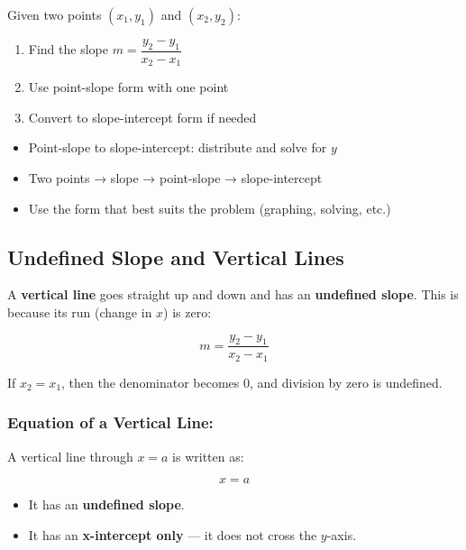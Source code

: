\documentclass[11pt]{article}
\begin{document}
Given two points \( (x_1, y_1) \) and \( (x_2, y_2) \):
\begin{enumerate}
  \item Find the slope \( m = \dfrac{y_2 - y_1}{x_2 - x_1} \)
  \item Use point-slope form with one point
  \item Convert to slope-intercept form if needed
\end{enumerate}

\begin{tcolorbox}[colback=purple!5!white, colframe=purple!80!black, title=Summary: Converting Forms]
\begin{itemize}
  \item Point-slope to slope-intercept: distribute and solve for \( y \)
  \item Two points → slope → point-slope → slope-intercept
  \item Use the form that best suits the problem (graphing, solving, etc.)
\end{itemize}
\end{tcolorbox}
\subsection{Undefined Slope and Vertical Lines}

A \textbf{vertical line} goes straight up and down and has an \textbf{undefined slope}. This is because its run (change in \( x \)) is zero:

\[
m = \frac{y_2 - y_1}{x_2 - x_1}
\]

If \( x_2 = x_1 \), then the denominator becomes 0, and division by zero is undefined.

\subsubsection*{Equation of a Vertical Line:}
A vertical line through \( x = a \) is written as:

\[
x = a
\]

\begin{itemize}
  \item It has an \textbf{undefined slope}.
  \item It has an \textbf{x-intercept only} — it does not cross the \( y \)-axis.
\end{itemize}

\begin{center}
\end{center}
\end{document}
